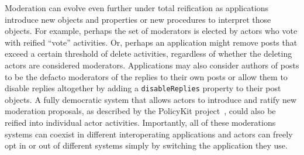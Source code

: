 Moderation can evolve even further under total reification
as applications introduce new objects and properties
or new procedures to interpret those objects.
For example,
perhaps the set of moderators is elected by actors who vote with reified ``vote'' activities.
Or, perhaps an application might remove posts that exceed a certain threshold of delete activities,
regardless of whether the deleting actors are considered moderators.
Applications may also consider authors of posts to be the defacto moderators of the replies to their
own posts or allow them to disable replies altogether by adding a \texttt{disableReplies}
property to their post objects.
A fully democratic system that allows actors to introduce and ratify new moderation proposals,
as described by the PolicyKit project~\cite{policykit}, could also be reified into
individual actor activities.
Importantly, all of these moderations systems can coexist in different interoperating
applications and actors can freely opt in or out of different systems simply by switching
the application they use.






